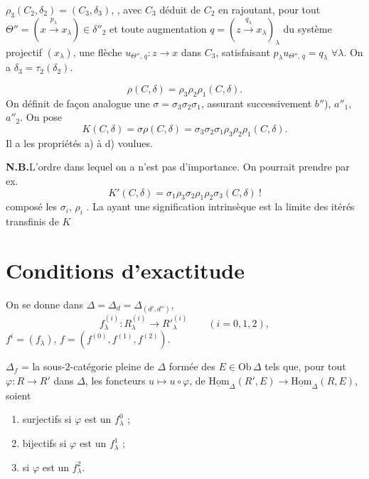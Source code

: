 \documentclass[11pt,a4paper]{article}
\begin{document}
$\rho_3(C_2, \delta_2) = (C_3, \delta_3)$, , avec
$C_3$ déduit de $C_2$ en rajoutant, pour tout
$\Theta'' = (x \xrightarrow{\,p_\lambda\,} x_\lambda) \in \delta''_2$ et toute
augmentation $q = (z \xrightarrow{\,q_\lambda\,} x_\lambda)_\lambda$ du système
projectif $(x_\lambda)$, une flèche
$u_{\Theta'',\, q} : z \to x$ dans $C_3$, satisfaisant
$p_\lambda u_{\Theta'',\, q} = q_\lambda$ $\forall \lambda$. On a
$\delta_3 = \tau_2(\delta_2)$.

\[
  \rho(C,\delta) = \rho_3 \rho_2 \rho_1 (C,\delta).
\]
On définit de façon analogue une  
$\sigma = \sigma_3 \sigma_2 \sigma_1$, assurant successivement $b''$),
 $a''_1$, $a''_2$. On pose
\[
  K(C,\delta) = \sigma\rho(C,\delta)
  = \sigma_3 \sigma_2 \sigma_1 \rho_3 \rho_2 \rho_1 (C,\delta).
\]
Il a les propriétés a) à d) voulues.

\textbf{N.B.}\quad L'ordre dans lequel on a \ill{} n'est pas d'importance. On
pourrait \ill{} prendre par ex.
\[
  K'(C,\delta) = \sigma_1 \rho_3 \sigma_2 \rho_1 \rho_2 \sigma_3 (C,\delta)\ !
\]
\ill{} composé les  $\sigma_i$,  $\rho_i$
\ill{}. La  \ill{} ayant une signification intrinsèque est la
limite des itérés transfinis de $K$ \ill{}

\section*{Conditions d'exactitude}

On se donne  
 dans
$\Delta = \Delta_d = \Delta_{(d',d'')}$,
\[
  f^{(i)}_\lambda : R^{(i)}_\lambda \longrightarrow R'^{(i)}_\lambda
  \qquad (i = 0,1,2),
\]
\ill{} $f^{i} = (f_\lambda)$, $f = (f^{(0)}, f^{(1)}, f^{(2)})$.

$\Delta_f$ = la sous-$2$-catégorie pleine de $\Delta$ formée des
$E \in \mathrm{Ob}\,\Delta$ tels que, 
pour tout $\varphi : R \to R'$ dans $\Delta$, les foncteurs
$u \mapsto u \circ \varphi$, de
$\underline{\mathrm{Hom}}_{\Delta}(R', E) \to \underline{\mathrm{Hom}}_{\Delta}(R, E)$,
soient

\begin{enumerate}
  \item[$a_0$)] surjectifs si $\varphi$ est un $f^0_\lambda$ ;
  \item[$a_1$)]  bijectifs \struck{\ill{}}  si $\varphi$ est un $f^1_\lambda$ ;
  \item[$a_2$)] \ill{} si $\varphi$ est un $f^2_\lambda$.
\end{enumerate}
\end{document}
